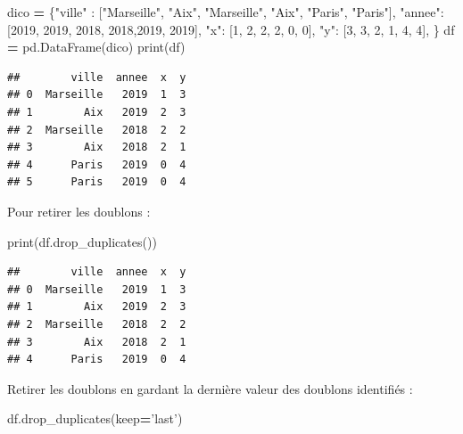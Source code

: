 \documentclass[12pt,]{book}
\newenvironment{Shaded}{\begin{snugshade}}{\end{snugshade}}
\newcommand{\DecValTok}[1]{\textcolor[rgb]{0.00,0.00,0.81}{#1}}
\newcommand{\StringTok}[1]{\textcolor[rgb]{0.31,0.60,0.02}{#1}}
\newcommand{\OperatorTok}[1]{\textcolor[rgb]{0.81,0.36,0.00}{\textbf{#1}}}
\newcommand{\BuiltInTok}[1]{#1}
\newcommand{\NormalTok}[1]{#1}
\numberwithin{equation}{section}
\numberwithin{countremarque}{section}
\begin{document}
\begin{Shaded}
\begin{Highlighting}[]
\NormalTok{dico }\OperatorTok{=}\NormalTok{ \{}\StringTok{"ville"}\NormalTok{ : [}\StringTok{"Marseille"}\NormalTok{, }\StringTok{"Aix"}\NormalTok{,}
                   \StringTok{"Marseille"}\NormalTok{, }\StringTok{"Aix"}\NormalTok{, }\StringTok{"Paris"}\NormalTok{, }\StringTok{"Paris"}\NormalTok{],}
        \StringTok{"annee"}\NormalTok{: [}\DecValTok{2019}\NormalTok{, }\DecValTok{2019}\NormalTok{, }\DecValTok{2018}\NormalTok{, }\DecValTok{2018}\NormalTok{,}\DecValTok{2019}\NormalTok{, }\DecValTok{2019}\NormalTok{],}
        \StringTok{"x"}\NormalTok{: [}\DecValTok{1}\NormalTok{, }\DecValTok{2}\NormalTok{, }\DecValTok{2}\NormalTok{, }\DecValTok{2}\NormalTok{, }\DecValTok{0}\NormalTok{, }\DecValTok{0}\NormalTok{],}
        \StringTok{"y"}\NormalTok{: [}\DecValTok{3}\NormalTok{, }\DecValTok{3}\NormalTok{, }\DecValTok{2}\NormalTok{, }\DecValTok{1}\NormalTok{, }\DecValTok{4}\NormalTok{, }\DecValTok{4}\NormalTok{],}
\NormalTok{       \} }
\NormalTok{df }\OperatorTok{=}\NormalTok{ pd.DataFrame(dico)}
\BuiltInTok{print}\NormalTok{(df)}
\end{Highlighting}
\end{Shaded}

\begin{lstlisting}
##        ville  annee  x  y
## 0  Marseille   2019  1  3
## 1        Aix   2019  2  3
## 2  Marseille   2018  2  2
## 3        Aix   2018  2  1
## 4      Paris   2019  0  4
## 5      Paris   2019  0  4
\end{lstlisting}

Pour retirer les doublons :

\begin{Shaded}
\begin{Highlighting}[]
\BuiltInTok{print}\NormalTok{(df.drop_duplicates())}
\end{Highlighting}
\end{Shaded}

\begin{lstlisting}
##        ville  annee  x  y
## 0  Marseille   2019  1  3
## 1        Aix   2019  2  3
## 2  Marseille   2018  2  2
## 3        Aix   2018  2  1
## 4      Paris   2019  0  4
\end{lstlisting}

Retirer les doublons en gardant la dernière valeur des doublons
identifiés :

\begin{Shaded}
\begin{Highlighting}[]
\NormalTok{df.drop_duplicates(keep}\OperatorTok{=}\StringTok{'last'}\NormalTok{)}
\end{Highlighting}
\end{Shaded}
\end{document}
